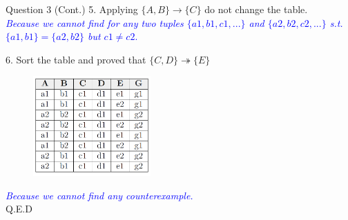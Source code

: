 \begin{frame}[fragile]{Question 3 (Cont.)}
5. Applying $\{A,B\} \rightarrow \{C\}$ do not change the table.\\\vspace{5pt}
\textcolor{blue}{{\small \textit{Because we cannot find for any two tuples $\{a1,b1,c1,...\}$ and $\{a2,b2,c2,...\}$ s.t. $\{a1,b1\}=\{a2,b2\}$ but $c1 \ne c2$}.}}\\\vspace{10pt}

6. Sort the table and proved that $\{C,D\}\twoheadrightarrow\{E\}$ 
	\begin{figure}
		\includegraphics[width=0.4\textwidth, trim=0 0 0 0, clip]{4221-t5/images/3-6.png}
	\end{figure}

\textcolor{blue}{{\small \textit{Because we cannot find any counterexample.}}}\\\vspace{10pt}
	\hfill Q.E.D
\end{frame}


